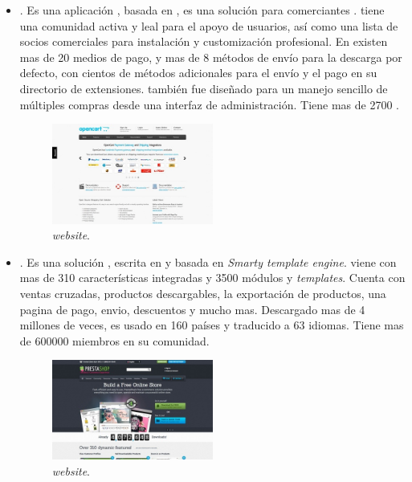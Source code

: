 \begin{itemize}
	\item \textbf{\nameOpenCart}. Es una aplicación \opensource, basada en \php, es una solución \ecommerce para comerciantes \online. \nameOpenCart tiene una comunidad activa y leal para el apoyo de usuarios, así como una lista de socios comerciales para instalación y customización profesional. En \nameOpenCart existen mas de 20 medios de pago, y mas de 8 métodos de envío para la descarga por defecto, con cientos de métodos adicionales para el envío y el pago en su directorio de extensiones. \nameOpenCart también fue diseñado para un manejo sencillo de múltiples compras desde una interfaz de administración. Tiene mas de 2700 \themes.
	
	\begin{figure}[h!]
		\centering
		\includegraphics[width=0.5\textwidth]{figuras/cap1/openCartWebsite.jpg}
		\caption{\nameOpenCart \textit{website}\cite{online_OpenCartWebsite}.}
	\end{figure}


	\item \textbf{\namePrestaShop}. Es una solución \ecommerce \opensource, escrita en \php y basada en \textit{Smarty template engine}. \namePrestaShop viene con mas de 310 características integradas y 3500 módulos y \textit{templates}. Cuenta con ventas cruzadas, productos descargables, la exportación de productos, una pagina de pago, envio, descuentos y mucho mas. Descargado mas de 4 millones de veces, \namePrestaShop es usado en 160 países y traducido a 63 idiomas. Tiene mas de 600000 miembros en su comunidad.

	\begin{figure}[h!]
		\centering
		\includegraphics[width=0.5\textwidth]{figuras/cap1/PrestaShopWebsite.jpg}
		\caption{\namePrestaShop \textit{website}\cite{online_PrestaShop}.}
	\end{figure}



\end{itemize}
